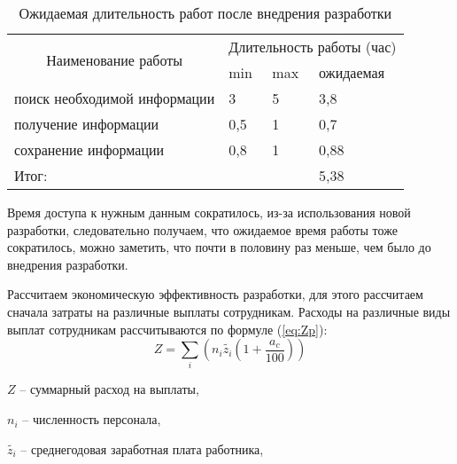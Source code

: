 \begin{table}[H]
\caption{Ожидаемая длительность работ после внедрения разработки }
\label{tabular:PosleTime}
\begin{center}
\begin{tabular}{|l|l|l|l|}
\hline
\multicolumn{1}{|c|}{\multirow{2}{*}{Наименование работы}} & \multicolumn{3}{c|}{Длительность работы (час)}                                       \\ \cline{2-4} 
\multicolumn{1}{|c|}{}                                     & \multicolumn{1}{l|}{min} & \multicolumn{1}{l|}{max} & \multicolumn{1}{l|}{ожидаемая} \\ \hline
поиск необходимой информации                               & 3                        & 5                        & 3,8                              \\ \hline
получение информации                                       & 0,5                        & 1                        & 0,7                              \\ \hline
сохранение информации                                      & 0,8                        & 1                        & 0,88                              \\ \hline
\multicolumn{3}{|l|}{Итог:}                                                                                      & 5,38                             \\ \hline
\end{tabular}
\end{center}
\end{table}

Время доступа к нужным данным сократилось, из-за использования новой разработки, следовательно получаем, что ожидаемое время работы тоже сократилось, можно заметить, что почти в половину раз меньше, чем было до внедрения разработки.

Рассчитаем экономическую эффективность разработки, для этого рассчитаем сначала затраты на различные выплаты сотрудникам. 
Расходы на различные виды выплат сотрудникам рассчитываются по формуле (\ref{eq:Zp}):
\begin{equation}\label{eq:Zp}
Z = \sum_{i}^{}{\left(n_{i}\tilde{z_{i}}\left(1+\frac{a_{c}}{100} \right) \right)}
\end{equation}

$Z$ -- суммарный расход на выплаты,

$n_{i}$ -- численность персонала,

$\tilde{z_{i}}$ -- среднегодовая заработная плата работника,

